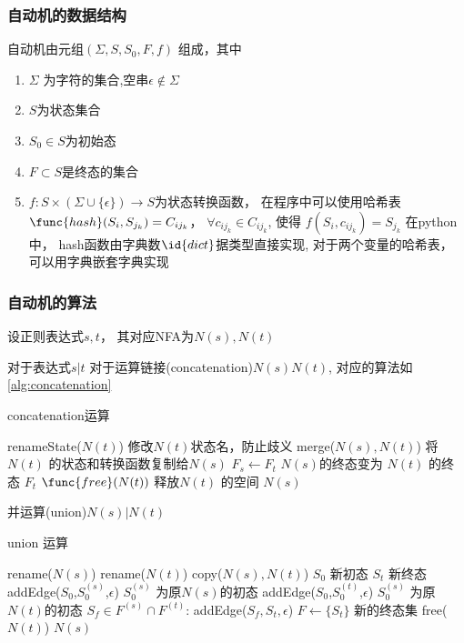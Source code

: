 \documentclass[../report.tex]{subfiles}
\begin{document}
\subsubsection{自动机的数据结构}
  自动机由元组$(\Sigma,S,S_0,F,f)$
  组成，其中
  \begin{enumerate}
    \item $\Sigma$ 为字符的集合,空串$\epsilon \notin \Sigma$
    \item $S$为状态集合
    \item $S_0 \in S$为初始态
    \item $F \subset S$是终态的集合
    \item $f:S \times (\Sigma \cup \{ \epsilon\}) \to S$为状态转换函数，
      在程序中可以使用哈希表
      $\func{hash}(S_i,S_{j_k}) = C_{ij_k}$，
      $\forall c_{ij_k} \in C_{ij_k}$,
      使得
      $f(S_i,c_{ij_k}) = S_{j_k}$
      在python中，
      hash函数由字典数$\id{dict}$据类型直接实现,
      对于两个变量的哈希表，
      可以用字典嵌套字典实现
  \end{enumerate}

\subsubsection{自动机的算法}
  设正则表达式$s,t$，
  其对应NFA为$N(s), N(t)$

  对于表达式$s|t$
  对于运算链接(concatenation)$N(s)N(t)$,
  对应的算法如%
  \cref{alg:concatenation}
  \begin{algorithm}[H]
    \caption{concatenation运算}
    \begin{codebox}
        \li renameState($N(t)$) \Comment 修改$N(t)$状态名，防止歧义
        \li merge($N(s),N(t)$) \Comment 将$N(t)$ 的状态和转换函数复制给$N(s)$
        \li $F_{s} \gets F_{t}$ \Comment $N(s)$的终态变为 $N(t)$ 的终态 $F_{t}$
        \li $\func{free}(N(t))$ \Comment 释放$N(t)$ 的空间
        \li \Return $N(s)$
    \end{codebox}
    \label{alg:concatenation}
  \end{algorithm}



  并运算(union)$N(s) | N(t)$
  \begin{algorithm}[H]
    \caption{union 运算}
    \begin{codebox}
        \li rename($N(s)$)
        \li rename($N(t)$)
        \li copy($N(s),N(t)$)
        \li {} $S_0$ \Comment 新初态
        \li {} $S_t$ \Comment 新终态
        \li addEdge($S_0$,$S_0^{(s)}$,$\epsilon$) \Comment $S_0^{(s)}$ 为原$N(s)$的初态
        \li addEdge($S_0$,$S_0^{(t)}$,$\epsilon$) \Comment $S_0^{(s)}$ 为原$N(t)$的初态
        \li\For $S_f \in F^{(s)} \cap F^{(t)}$:
        \Then
          \li addEdge($S_f,S_t,\epsilon$)
        \End
        \li $F \gets \{ S_t\} $  \Comment 新的终态集
        \li free($N(t)$)
        \li \Return $N(s)$
    \end{codebox}
    \label{alg:union}
  \end{algorithm}
\end{document}
